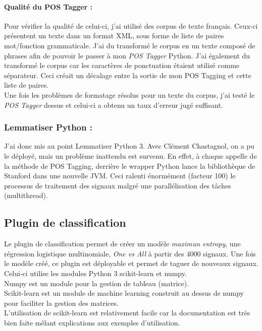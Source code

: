             \paragraph{Qualité du POS Tagger :}
                Pour vérifier la qualité de celui-ci, j'ai utilisé des corpus de texte français. Ceux-ci présentent un texte dans un format XML, sous forme de liste de paires mot/fonction grammaticale. J'ai du transformé le corpus en un texte composé de phrases afin de pouvoir le passer à mon \textit{POS Tagger} Python. J'ai également du transformé le corpus car les caractères de ponctuation étaient utilisé comme séparateur. Ceci créait un décalage entre la sortie de mon POS Tagging et cette liste de paires.\\
                Une fois les problèmes de formatage résolus pour un texte du corpus, j'ai testé le \textit{POS Tagger} dessus et celui-ci a obtenu un taux d'erreur jugé suffisant.

        \subsubsection{Lemmatiser Python :}
            J'ai donc mis au point Lemmatiser Python 3. Avec Clément Chastagnol, on a pu le déployé, mais un problème inattendu est survenu. En effet, à chaque appelle de la méthode de POS Tagging, derrière le wrapper Python lance la bibliothèque de Stanford dans une nouvelle JVM. Ceci ralenti énormément (facteur 100) le processus de traitement des signaux malgré une parallélisation des tâches (multithread).

    \subsection{Plugin de classification}
        Le plugin de classification permet de créer un modèle \textit{maximun entropy}, une régression logistique multinomiale, \textit{One vs All} à partir des 4000 signaux. Une fois le modèle créé, ce plugin est déployable et permet de taguer de nouveaux signaux. Celui-ci utilise les modules Python 3 scikit-learn et numpy.\\
        Numpy est un module pour la gestion de tableau (matrice).\\
        Scikit-learn est un module de machine learning construit au dessus de numpy pour faciliter la gestion des matrices.\\
        L'utilisation de scikit-learn est relativement facile car la documentation est très bien faite mêlant explications aux exemples d'utilisation.